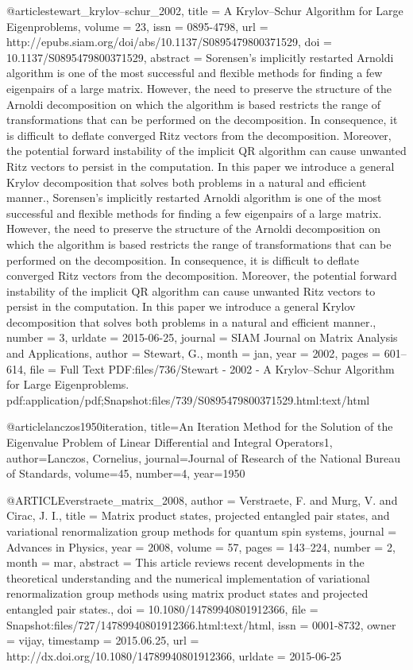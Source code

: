 @article{stewart_krylov--schur_2002,
    title = {A {Krylov}--{Schur} {Algorithm} for {Large} {Eigenproblems}},
    volume = {23},
    issn = {0895-4798},
    url = {http://epubs.siam.org/doi/abs/10.1137/S0895479800371529},
    doi = {10.1137/S0895479800371529},
    abstract = {Sorensen's implicitly restarted Arnoldi algorithm is one of the most successful and       flexible methods for finding a few eigenpairs of a large matrix. However, the need to preserve the        structure of the Arnoldi decomposition on which the algorithm is based restricts the range of             transformations that can be performed on the decomposition. In consequence, it is difficult to deflate    converged Ritz vectors from the decomposition. Moreover, the potential forward instability of the         implicit QR algorithm can cause unwanted Ritz vectors to persist in the computation. In this paper we     introduce a general Krylov decomposition that solves both problems in a natural and efficient manner.,    Sorensen's implicitly restarted Arnoldi algorithm is one of the most successful and flexible methods for  finding a few eigenpairs of a large matrix. However, the need to preserve the structure of the Arnoldi    decomposition on which the algorithm is based restricts the range of transformations that can be          performed on the decomposition. In consequence, it is difficult to deflate converged Ritz vectors from    the decomposition. Moreover, the potential forward instability of the implicit QR algorithm can cause     unwanted Ritz vectors to persist in the computation. In this paper we introduce a general Krylov          decomposition that solves both problems in a natural and efficient manner.},
    number = {3},
    urldate = {2015-06-25},
    journal = {SIAM Journal on Matrix Analysis and Applications},
    author = {Stewart, G.},
    month = jan,
    year = {2002},
    pages = {601--614},
    file = {Full Text PDF:files/736/Stewart - 2002 - A Krylov--Schur Algorithm for Large Eigenproblems.   pdf:application/pdf;Snapshot:files/739/S0895479800371529.html:text/html}
}

@article{lanczos1950iteration,
  title={An Iteration Method for the Solution of the Eigenvalue Problem of Linear Differential and Integral Operators1},
  author={Lanczos, Cornelius},
  journal={Journal of Research of the National Bureau of Standards},
  volume={45},
  number={4},
  year={1950}
}

@ARTICLE{verstraete_matrix_2008,
  author = {Verstraete, F. and Murg, V. and Cirac, J. I.},
  title = {Matrix product states, projected entangled pair states, and variational
    renormalization group methods for quantum spin systems},
  journal = {Advances in Physics},
  year = {2008},
  volume = {57},
  pages = {143--224},
  number = {2},
  month = mar,
  abstract = {This article reviews recent developments in the theoretical understanding
    and the numerical implementation of variational renormalization group
    methods using matrix product states and projected entangled pair
    states.},
  doi = {10.1080/14789940801912366},
  file = {Snapshot:files/727/14789940801912366.html:text/html},
  issn = {0001-8732},
  owner = {vijay},
  timestamp = {2015.06.25},
  url = {http://dx.doi.org/10.1080/14789940801912366},
  urldate = {2015-06-25}
}


